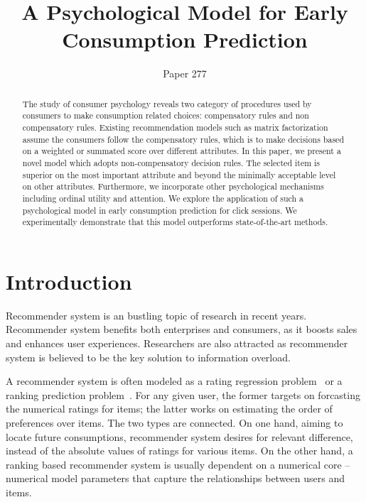 \documentclass[sigconf]{acmart}
\begin{document}
\title{A Psychological Model for Early Consumption Prediction}


\author{Paper 277}


\begin{abstract}
The study of consumer psychology reveals two category of procedures used by consumers to make consumption related choices: compensatory rules and non compensatory rules. Existing recommendation models such as matrix factorization assume the consumers follow the compensatory rules, which is to make decisions based on a weighted or summated score over different attributes. In this paper, we present a novel model which adopts non-compensatory decision rules. The selected item is superior on the most  important attribute and beyond the minimally acceptable level on other attributes. Furthermore, we incorporate other psychological mechanisms including ordinal utility and attention.  We explore the application of such a psychological model in early consumption prediction for click sessions. We experimentally demonstrate that this model outperforms state-of-the-art methods.
\end{abstract}


\maketitle
\section{Introduction}\label{sec:introduction}
Recommender system is an bustling topic of research in recent years. Recommender system benefits both enterprises and consumers, as it boosts sales and enhances user experiences. Researchers are also attracted as recommender system is believed to be the key solution to information overload.   
  
A recommender system is often modeled as a rating regression problem~\cite{Bobadilla2013Recommender} or a ranking prediction problem~\cite{Rendle2009BPR}. For any given user, the former targets on forcasting the numerical ratings for items; the latter works on estimating the order of preferences over items. The two types are connected. On one hand, aiming to locate future consumptions, recommender system desires for relevant difference, instead of the absolute values of ratings for various items. On the other hand, a ranking based recommender system is usually dependent on a numerical core -- numerical model parameters that capture the relationships between users and items.         
\end{document}
